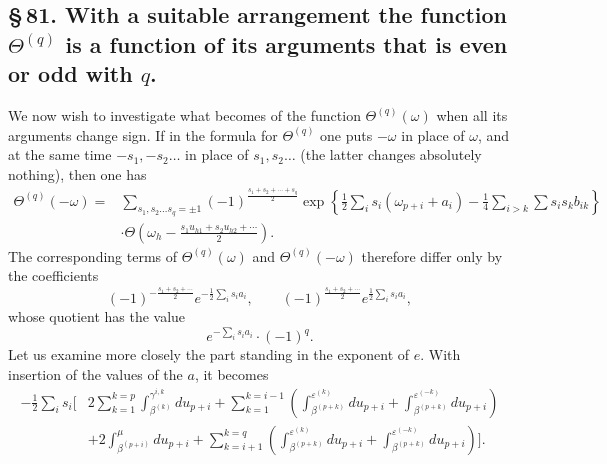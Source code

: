 \documentclass[10pt]{article}
\begin{document}

\subsection*{\S\,81. With a suitable arrangement the function \(\Theta^{(q)}\) is a function of its arguments that is even or odd with \(q\).}

We now wish to investigate what becomes of the function \(\Theta^{(q)}(\omega)\) when all its arguments change sign. If in the formula for \(\Theta^{(q)}\) one puts \(-\omega\) in place of \(\omega\), and at the same time \(-s_1,-s_2\ldots\) in place of \(s_1,s_2\ldots\) (the latter changes absolutely nothing), then one has
\[
\begin{aligned}
\Theta^{(q)}(-\omega)={}&
\sum_{s_1,s_2\ldots s_q=\pm1}(-1)^{\frac{s_1+s_2+\cdots+s_q}{2}}
\exp\!\left
\{\frac12\sum_i s_i(\omega_{p+i}+a_i)-\frac14\sum_{i>k}\sum s_i s_k b_{ik}\right\}\\
&\cdot \Theta\!\left(\omega_h-\frac{s_1u_{h1}+s_2u_{h2}+\cdots}{2}\right).
\end{aligned}
\]
The corresponding terms of \(\Theta^{(q)}(\omega)\) and \(\Theta^{(q)}(-\omega)\) therefore differ only by the coefficients
\[
(-1)^{-\frac{s_1+s_2+\cdots}{2}}e^{-\frac12\sum_i s_ia_i},\qquad
(-1)^{\frac{s_1+s_2+\cdots}{2}}e^{\frac12\sum_i s_ia_i},
\]
whose quotient has the value
\[
e^{-\sum_i s_i a_i}\cdot(-1)^q.
\]
Let us examine more closely the part standing in the exponent of \(e\). With insertion of the values of the \(a\), it becomes
\[
\begin{aligned}
-\frac12\sum_i s_i\Bigg[
&2\sum_{k=1}^{k=p}\int_{\beta^{(k)}}^{\gamma^{i,k}}du_{p+i}
+\sum_{k=1}^{k=i-1}\left(\int_{\beta^{(p+k)}}^{\varepsilon^{(k)}}du_{p+i}
+\int_{\beta^{(p+k)}}^{\varepsilon^{(-k)}}du_{p+i}\right)\\
&+2\int_{\beta^{(p+i)}}^{\mu}du_{p+i}
+\sum_{k=i+1}^{k=q}\left(\int_{\beta^{(p+k)}}^{\varepsilon^{(k)}}du_{p+i}
+\int_{\beta^{(p+k)}}^{\varepsilon^{(-k)}}du_{p+i}\right)
\Bigg].
\end{aligned}
\]
\end{document}

